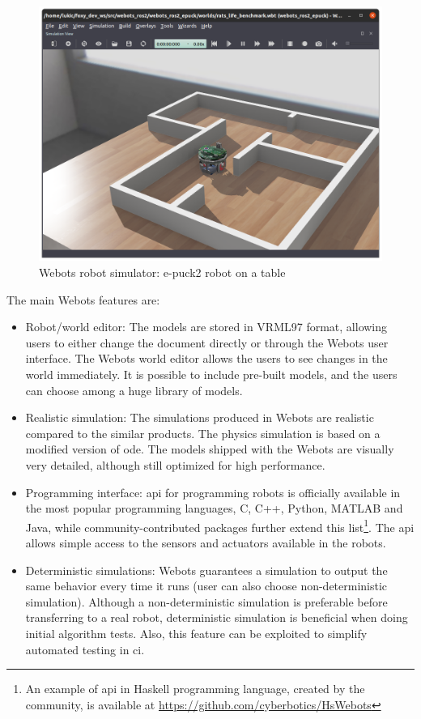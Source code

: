 \begin{figure}[H]
    \centering
    \includegraphics[width=\textwidth]{background/figures/webots.png}
    \caption{Webots robot simulator: e-puck2 robot on a table}
    \label{fig:background:webots}
\end{figure}

The main Webots features are:
\begin{itemize}
    \item Robot/world editor: The models are stored in VRML97 format, allowing users to either change the document directly or through the Webots user interface. 
    The Webots world editor allows the users to see changes in the world immediately.
    It is possible to include pre-built models, and the users can choose among a huge library of models.
    \item Realistic simulation: The simulations produced in Webots are realistic compared to the similar products. 
    The physics simulation is based on a modified version of \ac{ode}.
    The models shipped with the Webots are visually very detailed, although still optimized for high performance.
    \item Programming interface: \ac{api} for programming robots is officially available in the most popular programming languages, C, C++, Python, MATLAB and Java, while community-contributed packages further extend this list\footnote{An example of \ac{api} in Haskell programming language, created by the community, is available at \url{https://github.com/cyberbotics/HsWebots}}.
    The \ac{api} allows simple access to the sensors and actuators available in the robots.
    \item Deterministic simulations: Webots guarantees a simulation to output the same behavior every time it runs (user can also choose non-deterministic simulation).
    Although a non-deterministic simulation is preferable before transferring to a real robot, deterministic simulation is beneficial when doing initial algorithm tests.
    Also, this feature can be exploited to simplify automated testing in \ac{ci}.
\end{itemize}

